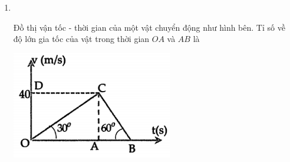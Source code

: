 \begin{enumerate}[label=\bfseries Câu \arabic*:]
\item {}\\
{\begin{minipage}[l]{0.7\textwidth}
		Đồ thị vận tốc - thời gian của một vật chuyển động như hình bên. Tỉ số về độ lớn gia tốc của vật trong thời gian $OA$ và $AB$ là
	\end{minipage}
\begin{minipage}{0.3\textwidth}
	\begin{center}
		\includegraphics[width=0.8\linewidth]{../figs/VN10-2022-PH-TP008-P-7}
	\end{center}
\end{minipage}
}
\end{enumerate}
